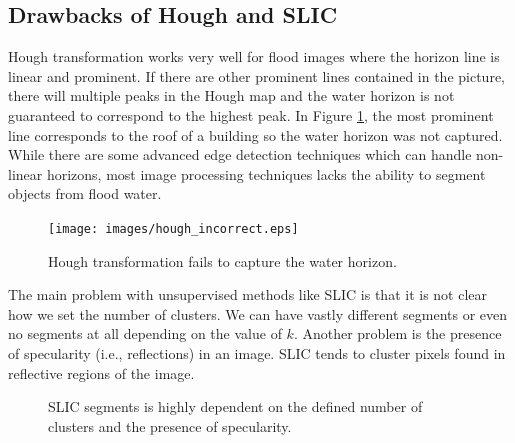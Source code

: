 \documentclass[review]{elsarticle}
\begin{document}
\subsection{Drawbacks of Hough and SLIC}

Hough transformation works very well for flood images where the horizon line is linear and prominent. If there are other prominent lines contained in the picture, there will multiple peaks in the Hough map and the water horizon is not guaranteed to correspond to the highest peak. In Figure \ref{fig:hough_fail}, the most prominent line corresponds to the roof of a building so the water horizon was not captured. While there are some advanced edge detection techniques which can handle non-linear horizons, most image processing techniques lacks the ability to segment objects from flood water.
\begin{figure}[h!]
\centering
\texttt{[image: images/hough\_incorrect.eps]}
\caption{Hough transformation fails to capture the water horizon.}
\label{fig:hough_fail}
\end{figure}

The main problem with unsupervised methods like SLIC is that it is not clear how we set the number of clusters. We can have vastly different segments or even no segments at all depending on the value of $k$. Another problem is the presence of specularity (i.e., reflections) in an image. SLIC tends to cluster pixels found in reflective regions of the image.
\begin{figure}[h!]
\begin{minipage}{.3\linewidth}
\centering
{}
\end{minipage}
\begin{minipage}{.8\linewidth}
\centering
{}
\end{minipage}\par
\begin{minipage}{.3\linewidth}
\centering
{}
\end{minipage}
\begin{minipage}{.8\linewidth}
\centering
{}
\end{minipage}\par
\caption{SLIC segments is highly dependent on the defined number of clusters and the presence of specularity.}
\label{fig:slico_wrong}
\end{figure}
\end{document}
